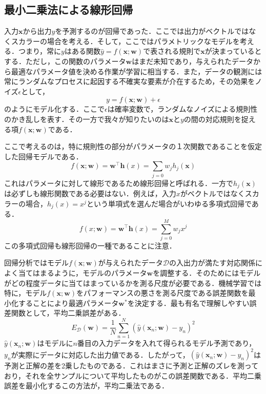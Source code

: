 \documentclass[a4paper,11pt]{jsreport}
\begin{document}
\subsection{最小二乗法による線形回帰}
入力$\bm{x}$から出力$y$を予測するのが回帰であった．ここでは出力がベクトルではなくスカラーの場合を考える．そして，ここではパラメトリックなモデルを考える．つまり，常に$y$はある関数$\hat{y} = f(\bm{x}; \bm{w})$で表される規則で$\bm{x}$が決まっているとする．ただし，この関数のパラメータ$\bm{w}$はまだ未知であり，与えられたデータから最適なパラメータ値を決める作業が学習に相当する．また，データの観測には常にランダムなプロセスに起因する不確実な要素が介在するため，その効果をノイズ$\epsilon$として，
\begin{equation}
  y = f(\bm{x}; \bm{w}) + \epsilon
\end{equation}
のようにモデル化する．ここで$\epsilon$は確率変数で，ランダムなノイズによる規則性のかき乱しを表す．その一方で我々が知りたいのは$\bm{x}$と$y$の間の対応規則を捉える項$f(\bm{x}; \bm{w})$である．\par
ここで考えるのは，特に規則性の部分がパラメータの１次関数であることを仮定した回帰モデルである．
\begin{equation}
  f(\bm{x}; \bm{w})
  = \bm{w}^{\top} \bm{h}(x) 
  = \sum_{j=0} w_j h_j(\bm{x})
\end{equation}
これはパラメータに対して線形であるため線形回帰と呼ばれる．一方で$h_j(\bm{x})$は必ずしも線形関数である必要はない．例えば，入力$x$がベクトルではなくスカラーの場合，$h_j(x) = x^j$という単項式を選んだ場合がいわゆる多項式回帰である．
\begin{equation}
  f(x; \bm{w}) = \bm{w}^{\top} \bm{h}(x) = \sum_{j=0}^M w_j x^j
\end{equation}
この多項式回帰も線形回帰の一種であることに注意．\par
回帰分析ではモデル$f(\bm{x}; \bm{w})$が与えられたデータ$\mathcal{D}$の入出力が満たす対応関係によく当てはまるように，モデルのパラメータ$\bm{w}$を調整する．そのためにはモデルがどの程度データに当てはまっているかを測る尺度が必要である．機械学習では特に，モデル$f(\bm{x}; \bm{w})$をパフォーマンスの悪さを測る尺度である誤差関数を最小化することにより最適パラメータ$\bm{w}^*$を決定する．最も有名で理解しやすい誤差関数として，平均二乗誤差がある．
\begin{equation}
  E_{\mathcal{D}}(\bm{w})
  = \frac{1}{N} \sum_{n=1}^{N}(\hat{y}(\bm{x}_n; \bm{w}) - y_n)^2
\end{equation}
$\hat{y}(\bm{x}_n; \bm{w})$はモデルに$n$番目の入力データを入れて得られるモデル予測であり，$y_n$が実際にデータに対応した出力値である．したがって，$(\hat{y}(\bm{x}_n; \bm{w}) - y_n)^2$は予測と正解の差を2乗したものである．これはまさに予測と正解のズレを測っており，それを全サンプルについて平均したものがこの誤差関数である．平均二乗誤差を最小化するこの方法が，平均二乗法である．\par
\end{document}
